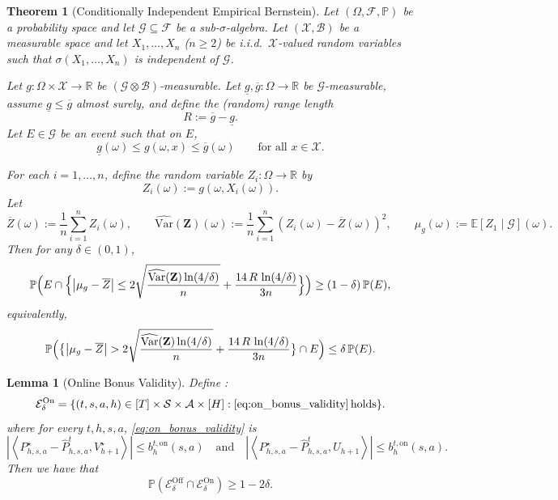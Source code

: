 \documentclass[10pt,a4paper]{amsart}
\newtheorem{lemma}{Lemma}
\newtheorem{theorem}{Theorem}
\newcommand{\bont}{b_h^{t,\on}} %
\newcommand{\highv}{U} %
\newcommand{\on}{\mathrm{on}} %
\begin{document}
\begin{theorem}[Conditionally Independent Empirical Bernstein]
\label{thm:cond_empirical_bernstein_final}
Let $(\Omega,\mathcal{F},\mathbb{P})$ be a probability space and let $\mathcal{G}\subseteq\mathcal{F}$ be a sub-$\sigma$-algebra.
Let $(\mathcal{X},\mathcal{B})$ be a measurable space and let $X_1,\dots,X_n$ ($n\ge 2$) be i.i.d.\ $\mathcal{X}$-valued random variables such that $\sigma(X_1,\dots,X_n)$ is independent of $\mathcal{G}$.

Let $g:\Omega\times\mathcal{X}\to\mathbb{R}$ be $(\mathcal{G}\otimes\mathcal{B})$-measurable.
Let $\underline{g},\overline{g}:\Omega\to\mathbb{R}$ be $\mathcal{G}$-measurable, assume $\underline{g}\le \overline{g}$ almost surely, and define the (random) range length
\[
R:=\overline{g}-\underline{g}.
\]
Let $E\in\mathcal{G}$ be an event such that on $E$,
\[
\underline{g}(\omega)\le g(\omega,x)\le \overline{g}(\omega)
\qquad
\text{for all }x\in\mathcal{X}.
\]

For each $i=1,\dots,n$, define the random variable $Z_i:\Omega\to\mathbb{R}$ by
\[
Z_i(\omega):=g(\omega,X_i(\omega)).
\]
Let
\[
\overline{Z}(\omega):=\frac{1}{n}\sum_{i=1}^n Z_i(\omega),
\qquad
\widehat{\mathrm{Var}}(\mathbf Z)(\omega)
:=\frac{1}{n}\sum_{i=1}^n (Z_i(\omega)-\overline{Z}(\omega))^2,
\qquad
\mu_g(\omega):=\mathbb E[Z_1\mid \mathcal{G}](\omega).
\]
Then for any $\delta\in(0,1)$,
\[
\mathbb{P}\Bigl(
E\cap\Bigl\{
\bigl|\mu_g-\overline{Z}\bigr|
\le
2\sqrt{\frac{\widehat{\mathrm{Var}}(\mathbf Z)\ln(4/\delta)}{n}}
+
\frac{14\,R\,\ln(4/\delta)}{3n}
\Bigr\}
\Bigr)
\ge
(1-\delta)\,\mathbb{P}(E),
\]
equivalently,
\[
\mathbb{P}\Bigl(
\bigl\{
\bigl|\mu_g-\overline{Z}\bigr|
>
2\sqrt{\frac{\widehat{\mathrm{Var}}(\mathbf Z)\ln(4/\delta)}{n}}
+
\frac{14\,R\,\ln(4/\delta)}{3n}
\bigr\}\cap E
\Bigr)
\le
\delta\,\mathbb{P}(E).
\]
\end{theorem}

\begin{lemma}[Online Bonus Validity]
\label{lem:on_bonus_validity}
Define :
\begin{equation}\label{eq:def_Eon}
\mathcal{E}^{\mathrm{On}}_\delta=\{(t,s,a,h) \in [T]\times\mathcal{S} \times \mathcal{A} \times [H]:\eqref{eq:on_bonus_validity}\,\mathrm{holds}\}.
\end{equation}
where for every $t, h, s, a$, \eqref{eq:on_bonus_validity} is
\begin{equation}\label{eq:on_bonus_validity}
| \left \langle P^{\star}_{h,s,a}-\widehat{P}_{h,s,a}^{t},V_{h+1}^{\star} \right \rangle| \le \bont(s,a) \quad \text{and} \quad | \left \langle P_{h,s,a}^{\star}-\widehat{P}_{h,s,a}^{t}, \highv_{h+1} \right \rangle| \le \bont(s,a).
\end{equation}
Then we have that
\[ \mathbb{P}(\mathcal{E}^{\mathrm{Off}}_\delta \cap \mathcal{E}^{\mathrm{On}}_\delta) \ge 1 - 2\delta.\]
\end{lemma}
\end{document}
